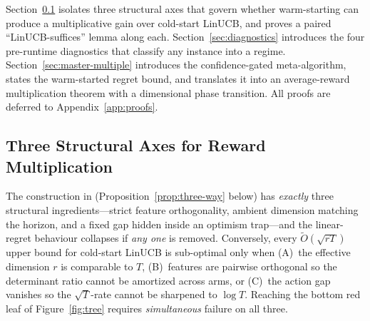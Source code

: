 \documentclass{article}
\theoremstyle{definition}
\theoremstyle{remark}
\theoremstyle{remark}
\begin{document}
Section~\ref{sec:axes} isolates three structural axes that govern whether
warm-starting can produce a multiplicative gain over cold-start LinUCB, and
proves a paired ``LinUCB-suffices'' lemma along each.
Section~\ref{sec:diagnostics} introduces the four pre-runtime diagnostics that
classify any instance into a regime.
Section~\ref{sec:master-multiple} introduces the confidence-gated
meta-algorithm, states the warm-started regret bound, and translates it into
an average-reward multiplication theorem with a dimensional phase transition.
All proofs are deferred to Appendix~\ref{app:proofs}.

\subsection{Three Structural Axes for Reward Multiplication}
\label{sec:axes}

The construction in \cite{chen2024llmdecision} (Proposition~\ref{prop:three-way}
below) has \emph{exactly} three structural ingredients---strict feature
orthogonality, ambient dimension matching the horizon, and a fixed gap hidden
inside an optimism trap---and the linear-regret behaviour collapses if
\emph{any one} is removed. Conversely, every $\widetilde O(\sqrt{rT})$ upper
bound for cold-start LinUCB \cite{abbasi2011improved,chu2011contextual,
dani2008stochastic,lattimore2020bandit} is sub-optimal only when (A)~the
effective dimension $r$ is comparable to $T$, (B)~features are pairwise
orthogonal so the determinant ratio cannot be amortized across arms, or
(C)~the action gap vanishes so the $\sqrt T$-rate cannot be sharpened to
$\log T$. Reaching the bottom red leaf of Figure~\ref{fig:tree} requires
\emph{simultaneous} failure on all three.
\end{document}
